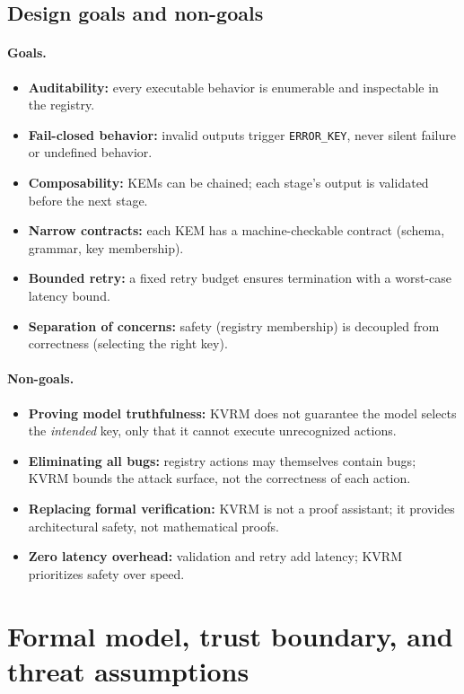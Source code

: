 \documentclass[11pt]{article}
\begin{document}
\subsection{Design goals and non-goals}
\paragraph{Goals.}
\begin{itemize}[leftmargin=*]
  \item \textbf{Auditability:} every executable behavior is enumerable and inspectable in the registry.
  \item \textbf{Fail-closed behavior:} invalid outputs trigger \texttt{ERROR\_KEY}, never silent failure or undefined behavior.
  \item \textbf{Composability:} KEMs can be chained; each stage's output is validated before the next stage.
  \item \textbf{Narrow contracts:} each KEM has a machine-checkable contract (schema, grammar, key membership).
  \item \textbf{Bounded retry:} a fixed retry budget ensures termination with a worst-case latency bound.
  \item \textbf{Separation of concerns:} safety (registry membership) is decoupled from correctness (selecting the right key).
\end{itemize}

\paragraph{Non-goals.}
\begin{itemize}[leftmargin=*]
  \item \textbf{Proving model truthfulness:} KVRM does not guarantee the model selects the \emph{intended} key, only that it cannot execute unrecognized actions.
  \item \textbf{Eliminating all bugs:} registry actions may themselves contain bugs; KVRM bounds the attack surface, not the correctness of each action.
  \item \textbf{Replacing formal verification:} KVRM is not a proof assistant; it provides architectural safety, not mathematical proofs.
  \item \textbf{Zero latency overhead:} validation and retry add latency; KVRM prioritizes safety over speed.
\end{itemize}

\section{Formal model, trust boundary, and threat assumptions}\label{sec:formal}
\end{document}
